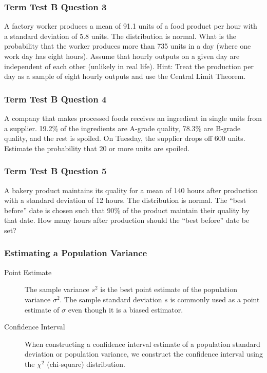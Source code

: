 \documentclass[xcolor=dvipsnames]{beamer}
\newcommand{\esh}{91.1}
\newcommand{\chu}{5.8}
\newcommand{\pee}{735}
\newcommand{\ood}{19.2}
\newcommand{\tee}{78.3}
\newcommand{\aih}{600}
\newcommand{\aoj}{20}
\newcommand{\eep}{140}
\newcommand{\eim}{12}
\newcommand{\sho}{90}
\begin{document}
\begin{frame}
  \frametitle{Term Test B Question 3}
  A factory worker produces a mean of {\esh} units of a food
product per hour with a standard deviation of {\chu} units. The
distribution is normal. What is the probability that the worker
produces more than {\pee} units in a day (where one work day has eight
hours). Assume that hourly outputs on a given day are independent of
each other (unlikely in real life). Hint: Treat the production per day
as a sample of eight hourly outputs and use the Central Limit Theorem.
\end{frame}

\begin{frame}
  \frametitle{Term Test B Question 4}
  A company that makes processed foods receives an
ingredient in single units from a supplier. {\ood}\% of the ingredients
are A-grade quality, {\tee}\% are B-grade quality, and the rest is
spoiled. On Tuesday, the supplier drops off {\aih} units. Estimate the
probability that {\aoj} or more units are spoiled.
\end{frame}

\begin{frame}
  \frametitle{Term Test B Question 5}
  A bakery product maintains its quality for a mean of {\eep}
hours after production with a standard deviation of {\eim} hours. The
distribution is normal. The ``best before'' date is chosen such that
{\sho}\% of the product maintain their quality by that date. How many
hours after production should the ``best before'' date be set?
\end{frame}

\begin{frame}
  \frametitle{Estimating a Population Variance}
  \begin{description}
  \item[Point Estimate] The sample variance $s^{2}$ is the best point
    estimate of the population variance $\sigma^{2}$. The sample
    standard deviation $s$ is commonly used as a point estimate of
    $\sigma$ even though it is a biased estimator.
  \item[Confidence Interval] When constructing a confidence interval
    estimate of a population standard deviation or population
    variance, we construct the confidence interval using the
    \alert{$\chi^{2}$ (chi-square) distribution}.
  \end{description}
\end{frame}
\end{document}
